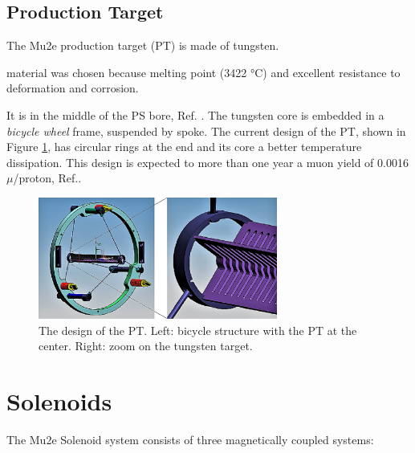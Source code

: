 \subsection{Production Target}
The Mu2e production target (PT)  is made of tungsten. 

 material was  chosen because 
melting point (3422 °C) and  excellent resistance to deformation and corrosion.

It is  in the middle of the PS bore, Ref. \cite{bartoszek2015mu2e}.
The tungsten core is embedded in a \textit{bicycle wheel} frame, 
suspended by  spoke.
The current design of the PT, shown in Figure \ref{fig:PT}, 
has circular rings at the end and its  core  a better temperature 
dissipation. This design is expected to  more than one year
 a muon yield of 0.0016 $\mu$/proton, Ref.\cite{PT}.
\begin{figure}[!h]
    \centering
    \includegraphics[width =0.7\textwidth]{figures/png/Screenshot_20240706_114229.png}
    \caption[The Production Target design.]{The design of the PT. Left: bicycle 
      structure with the PT at the
    center. Right: zoom on the tungsten target.}
    \label{fig:PT}
\end{figure}

\section{Solenoids}
{\red The Mu2e Solenoid system consists of three magnetically coupled systems}:

